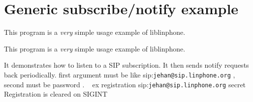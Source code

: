 \section{Generic subscribe/notify example}
\label{group__notify__tutorials}


This program is a {\itshape very} simple usage example of liblinphone.  


This program is a {\itshape very} simple usage example of liblinphone. 

It demonstrates how to listen to a S\+IP subscription. It then sends notify requests back periodically. first argument must be like sip\+:{\tt jehan@sip.\+linphone.\+org} , second must be password . ~\newline
 ex registration sip\+:{\tt jehan@sip.\+linphone.\+org} secret ~\newline
Registration is cleared on S\+I\+G\+I\+NT ~\newline
 
